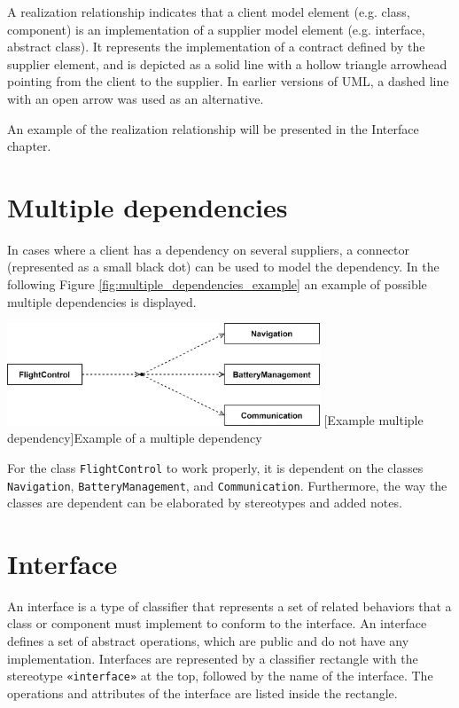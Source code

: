 \documentclass[
	12pt,
    a4paper,
    egregdoesnotlikesansseriftitles, %
    toc=chapterentrywithdots,
    oneside, openany,
    titlepage,
    parskip=half,
    headings=normal,  %
    listof=totoc,
    bibliography=totocnumbered,
    index=totoc,
    captions=tableheading,  %
    listof=flat,
    numbers=noenddot, %
    final]
    {scrbook}
\begin{document}
A realization relationship indicates that a client model element (e.g. class, component) is an implementation of a supplier model element (e.g. interface, abstract class). 
It represents the implementation of a contract defined by the supplier element, and is depicted as a solid line with a hollow triangle arrowhead pointing from the client to the supplier.
In earlier versions of UML, a dashed line with an open arrow was used as an alternative. 
\cite[p.164]{uml}

An example of the realization relationship will be presented in the Interface chapter.


\section{Multiple dependencies}
In cases where a client has a dependency on several suppliers, a connector (represented as a small black dot) can be used to model the dependency.  \cite[p. 160]{uml}
In the following Figure \ref{fig:multiple_dependencies_example} an example of possible multiple dependencies is displayed.

\vspace{1em}
\begin{minipage}{\linewidth}
	\centering
	\includegraphics[width=0.7\textwidth]{figures/dependencies/multiple_dependencies.jpg}
	[Example multiple dependency]{Example of a multiple dependency}
	\label{fig:multiple_dependencies_example}
\end{minipage}

For the class \texttt{FlightControl} to work properly, it is dependent on the classes \texttt{Navigation}, \texttt{BatteryManagement}, and \texttt{Communication}.
Furthermore, the way the classes are dependent can be elaborated by stereotypes and added notes.

\section{Interface}

An interface is a type of classifier that represents a set of related behaviors that a class or component must implement to conform to the interface. 
An interface defines a set of abstract operations, which are public and do not have any implementation.
Interfaces are represented by a classifier rectangle with the stereotype \texttt{«interface»} at the top, followed by the name of the interface. 
The operations and attributes of the interface are listed inside the rectangle. \cite[p. 130-131]{uml}
\end{document}
